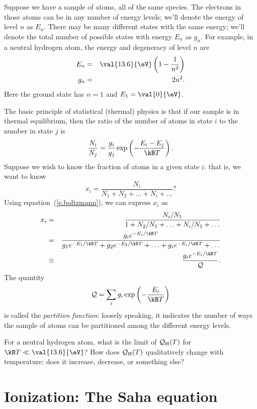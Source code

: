 Suppose we have a sample of atoms, all of the same species.  The electrons in those atoms can be in any number of energy levels; we'll denote the energy of level $n$ as $E_{n}$.  There may be many different states with the same energy; we'll denote the total number of possible states with energy $E_{n}$ as $g_{n}$.  For example, in a neutral hydrogen atom, the energy and degeneracy of level $n$ are
\begin{eqnarray*}
 E_{n} &=& \val{13.6}{\eV}\left(1-\frac{1}{n^{2}}\right)\\
 g_{n} &=& 2n^{2}.
\end{eqnarray*}
Here the ground state has $n = 1$ and $E_{1} = \val{0}{\eV}$.

The basic principle of statistical (thermal) physics is that if our sample is in thermal equilibrium, then the ratio of the number of atoms in state $i$ to the number in state $j$ is
\begin{equation}\label{e.boltzmann}
\frac{N_{i}}{N_{j}} = \frac{g_{i}}{g_{j}} 
\exp\left(-\frac{E_{i}-E_{j}}{\kB T}\right).
\end{equation}
Suppose we wish to know the fraction of atoms in a given state $i$: that is, we want to know
\[	x_{i} = \frac{N_{i}}{N_{1}+N_{2}+\ldots+N_{i}+\ldots} ? \]
Using equation~(\ref{e.boltzmann}), we can express $x_{i}$ as 
\begin{eqnarray}
  x_{i} &=& \frac{N_{i}/N_{1}}{1+N_{2}/N_{1}+\ldots+N_{i}/N_{1}+\ldots}\nonumber\\
        &=& \frac{g_{i}e^{-E_{i}/\kB T}}{g_{1}e^{-E_{1}/\kB T}+g_{2}e^{-E_{2}/\kB T}+\ldots+g_{i}e^{-E_{i}/\kB T}+\ldots} \nonumber\\
        &\equiv& \frac{g_{i}e^{-E_{i}/\kB T}}{\pfcn}.
\end{eqnarray}
The quantity 
\[ \pfcn = \sum_{i} g_{i}\exp\left(-\frac{E_{i}}{\kB T}\right) \]
is called the \emph{partition function}: loosely speaking, it indicates the number of ways the sample of atoms can be partitioned among the different energy levels.

\begin{exercisebox}
For a neutral hydrogen atom, what is the limit of $\mathcal{Q}_{\mathrm{H}}(T)$ for $\kB T \ll \val{13.6}{\eV}$?  How does $\mathcal{Q}_{\mathrm{H}}(T)$ qualitatively change with temperature: does it increase, decrease, or something else?
\end{exercisebox}

\section{Ionization: The Saha equation}
\label{s.saha-eqn}

